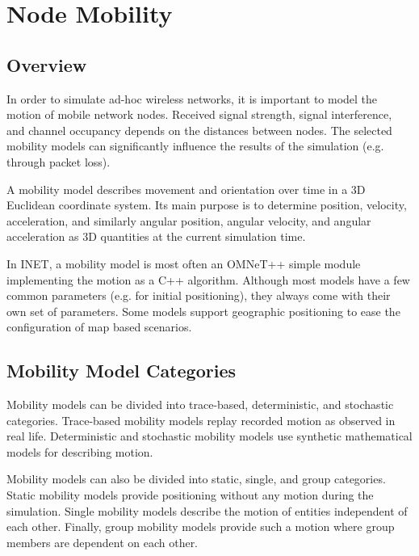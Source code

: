 \chapter{Node Mobility}
\label{cha:mobility}

\section{Overview}

In order to simulate ad-hoc wireless networks, it is important to model the
motion of mobile network nodes. Received signal strength, signal
interference, and channel occupancy depends on the distances between nodes.
The selected mobility models can significantly influence the results of the
simulation (e.g. through packet loss).

A mobility model describes movement and orientation over time in a 3D
Euclidean coordinate system. Its main purpose is to determine position,
velocity, acceleration, and similarly angular position, angular velocity,
and angular acceleration as 3D quantities at the current simulation time.

In INET, a mobility model is most often an OMNeT++ simple module
implementing the motion as a C++ algorithm. Although most models have a few
common parameters (e.g. for initial positioning), they always come with
their own set of parameters. Some models support geographic positioning to
ease the configuration of map based scenarios.

\section{Mobility Model Categories}

Mobility models can be divided into trace-based, deterministic, and
stochastic categories. Trace-based mobility models replay recorded motion
as observed in real life. Deterministic and stochastic mobility models use
synthetic mathematical models for describing motion.

Mobility models can also be divided into static, single, and group
categories. Static mobility models provide positioning without any motion
during the simulation. Single mobility models describe the motion of
entities independent of each other. Finally, group mobility models provide
such a motion where group members are dependent on each other.

